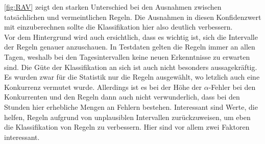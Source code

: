 \autoref{fig:RAV} zeigt den starken Unterschied bei den Ausnahmen zwischen tatsächlichen und vermeintlichen Regeln. Die Ausnahmen in diesen Konfidenzwert mit einzuberechnen sollte die Klassifikation hier also deutlich verbessern.\\
Vor dem Hintergrund wird auch ersichtlich, dass es wichtig ist, sich die Intervalle der Regeln genauer anzuschauen. In Testdaten gelten die Regeln immer an allen Tagen, weshalb bei den Tagesintervallen keine neuen Erkenntnisse zu erwarten sind. Die Güte der Klassifikation an sich ist auch nicht besonders aussagekräftig. Es wurden zwar für die Statistik nur die Regeln ausgewählt, wo letzlich auch eine Konkurrenz vermutet wurde. Allerdings ist es bei der Höhe der $\alpha$-Fehler bei den Konkurrenten und den Regeln dann auch nicht verwunderlich, dass bei den Stunden hier erhebliche Mengen an Fehlern bestehen. Interessant sind Werte, die helfen, Regeln aufgrund von unplausiblen Intervallen zurückzuweisen, um eben die Klassifikation von Regeln zu verbessern. Hier sind vor allem zwei Faktoren interessant.
